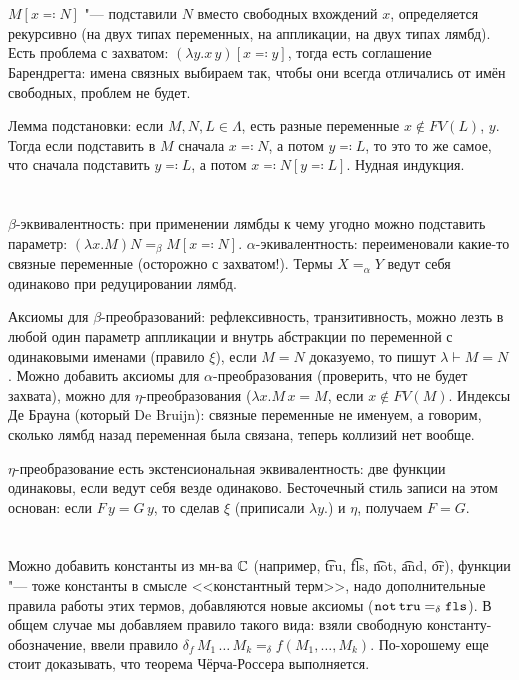 \section{} %
$M[x \eqcolon N]$ "--- подставили $N$ вместо свободных вхождений $x$,
определяется рекурсивно (на двух типах переменных, на аппликации, на двух типах лямбд).
Есть проблема с захватом: $(\lambda y. x\, y)[x \eqcolon y]$, тогда есть соглашение
Барендрегта: имена связных выбираем так, чтобы они всегда отличались от имён свободных,
проблем не будет.

Лемма подстановки: если $M, N, L \in \Lambda$, есть разные переменные $x \notin FV(L)$, $y$.
Тогда если подставить в $M$ сначала $x\eqcolon N$, а потом $y \eqcolon L$, то это
то же самое, что сначала подставить $y \eqcolon L$, а потом $x\eqcolon N[y\eqcolon L]$.
Нудная индукция.

\section{} %
$\beta$-эквивалентность: при применении лямбды к чему угодно можно подставить параметр:
$(\lambda x . M)N =_\beta M[x\eqcolon N]$.
$\alpha$-экивалентность: переименовали какие-то связные переменные (осторожно с захватом!).
Термы $X=_\alpha Y$ ведут себя одинаково при редуцировании лямбд.

Аксиомы для $\beta$-преобразований: рефлексивность, транзитивность, можно лезть в любой один
параметр аппликации и внутрь абстракции по переменной с одинаковыми именами (правило $\xi$),
если $M=N$ доказуемо, то пишут $\lambda \vdash M = N$.
Можно добавить аксиомы для $\alpha$-преобразования (проверить, что не будет захвата),
можно для $\eta$-преобразования ($\lambda x . M\, x = M$, если $x \notin FV(M)$.
Индексы Де Брауна (который De Bruijn): связные переменные не именуем, а говорим, сколько лямбд
назад переменная была связана, теперь коллизий нет вообще.

$\eta$-преобразование есть экстенсиональная эквивалентность: две функции одинаковы, если ведут
себя везде одинаково.
Бесточечный стиль записи на этом основан: если $F\, y = G\, y$, то сделав $\xi$ (приписали $\lambda y .$) и $\eta$,
получаем $F=G$.

\section{} %
Можно добавить константы из мн-ва $\mathbb{C}$ (например, \t{tru}, \t{fls}, \t{not}, \t{and}, \t{or}),
функции "--- тоже константы в смысле <<константный терм>>,
надо дополнительные правила работы этих термов, добавляются новые аксиомы ($\texttt{not}\,\texttt{tru}=_\delta \texttt{fls}$).
В общем случае мы добавляем правило такого вида: взяли свободную константу-обозначение,
ввели правило $\delta_f\,M_1\,\dots\,M_k =_\delta f(M_1, \dots, M_k)$.
По-хорошему еще стоит доказывать, что теорема Чёрча-Россера выполняется.

